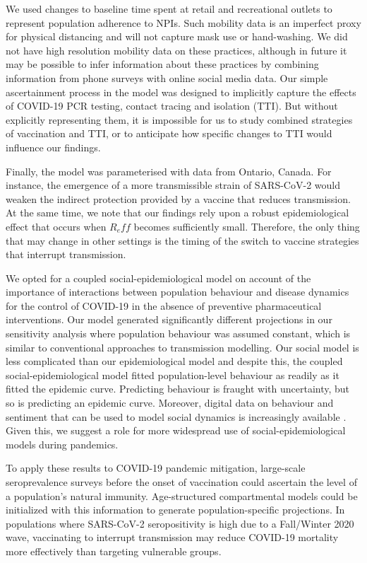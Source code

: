 We used changes to baseline time spent at retail and recreational outlets to represent population adherence to NPIs.  Such mobility data is an imperfect proxy for physical distancing and will not capture mask use or hand-washing.  We did not have high resolution mobility data on these practices, although in future it may be possible to infer information about these practices by combining information from phone surveys with online social media data. Our simple ascertainment process in the model was designed to implicitly capture the effects of COVID-19 PCR testing, contact tracing and isolation (TTI). But without explicitly representing them, it is impossible for us to study combined strategies of vaccination and TTI, or to anticipate how specific changes to TTI would influence our findings. 

Finally, the model was parameterised with data from Ontario, Canada. For instance, the emergence of a more transmissible strain of SARS-CoV-2 would weaken the indirect protection provided by a vaccine that reduces transmission. At the same time, we note that our findings rely upon a robust epidemiological effect that occurs when $R_eff$ becomes sufficiently small. Therefore, the only thing that may change in other settings is the timing of the switch to vaccine strategies that interrupt transmission. 


We opted for a coupled social-epidemiological model on account of the importance of interactions between population behaviour and disease dynamics for the control of COVID-19 in the absence of preventive pharmaceutical interventions. Our model generated significantly different projections in our sensitivity analysis where population behaviour was assumed constant, which is similar to conventional approaches to transmission modelling. Our social model is less complicated than our epidemiological model and despite this, the coupled social-epidemiological model fitted population-level behaviour as readily as it fitted the epidemic curve. Predicting behaviour is fraught with uncertainty, but so is predicting an epidemic curve. Moreover, digital data on behaviour and sentiment that can be used to model social dynamics is increasingly available \cite{salathe2012digital}.  Given this, we suggest a role for more widespread use of  social-epidemiological models during pandemics. 

To apply these results to COVID-19 pandemic mitigation, large-scale seroprevalence surveys before the onset of vaccination could ascertain the level of a population's natural immunity.  Age-structured compartmental models could be initialized with this information to generate population-specific projections. In populations where SARS-CoV-2 seropositivity is high due to a Fall/Winter 2020 wave, vaccinating to interrupt transmission may reduce COVID-19 mortality more effectively than targeting vulnerable groups. 

